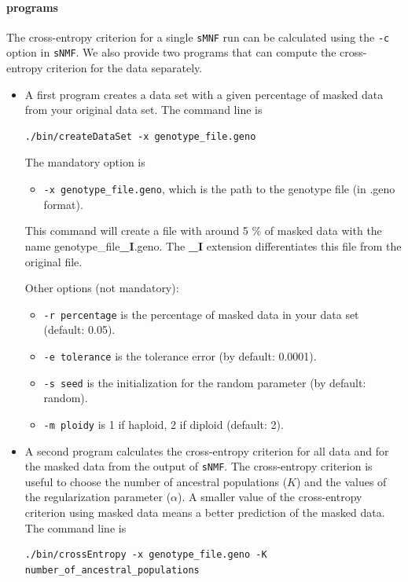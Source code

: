 \documentclass[10pt,a4paper]{article}
\begin{document}
\paragraph{programs}
The cross-entropy criterion for a single {\tt sMNF} run can be calculated using the \verb|-c| option in {\tt sNMF}. 
We also provide two programs that can compute the cross-entropy criterion for the data separately. 
\begin{itemize}
\item A first program creates a data set with a given percentage of masked data from your original data set.
The command line is
\begin{Verbatim}[frame=single]
./bin/createDataSet -x genotype_file.geno
\end{Verbatim}

The mandatory option is
\begin{itemize}
\item \verb|-x genotype_file.geno|, which is the path to the genotype file (in .geno format).
\end{itemize}

This command will create a file with around 5 \% of masked data with the name genotype\_file{\bf\_I}.geno. 
The {\bf\_I} extension differentiates this file from the original file. 

\noindent
Other options (not mandatory):
\begin{itemize}
\item \verb|-r percentage| is the percentage of masked data in your data set (default: 0.05). 
\item \verb|-e tolerance| is the tolerance error (by default: 0.0001). 
\item \verb|-s seed| is the initialization for the random parameter (by default: random). 
\item \verb|-m ploidy| is 1 if haploid, 2 if diploid (default: 2). 
\end{itemize}

\item A second program calculates the cross-entropy criterion for all data and for the masked data from the 
output of {\tt sNMF}. The cross-entropy criterion is useful to choose the number of 
ancestral populations ($K$) and the values of the regularization parameter ($\alpha$). 
A smaller value of the cross-entropy criterion using masked data means a better prediction of the masked data.
The command line is
\begin{Verbatim}[frame=single]
./bin/crossEntropy -x genotype_file.geno -K number_of_ancestral_populations
\end{Verbatim}


\end{itemize}
\end{document}
